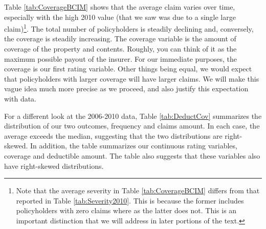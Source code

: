 \documentclass[]{book}
\let\rmarkdownfootnote\footnote%
\def\footnote{\protect\rmarkdownfootnote}
\theoremstyle{definition}
\theoremstyle{definition}
\theoremstyle{definition}
\theoremstyle{remark}
\begin{document}
Table \ref{tab:CoverageBCIM} shows that the average claim varies over
time, especially with the high 2010 value (that we saw was due to a
single large claim)\footnote{Note that the average severity in Table
  \ref{tab:CoverageBCIM} differs from that reported in Table
  \ref{tab:Severity2010}. This is because the former includes
  policyholders with zero claims where as the latter does not. This is
  an important distinction that we will address in later portions of the
  text.}. The total number of policyholders is steadily declining and,
conversely, the coverage is steadily increasing. The coverage variable
is the amount of coverage of the property and contents. Roughly, you can
think of it as the maximum possible payout of the insurer. For our
immediate purposes, the coverage is our first rating variable. Other
things being equal, we would expect that policyholders with larger
coverage will have larger claims. We will make this vague idea much more
precise as we proceed, and also justify this expectation with data.

For a different look at the 2006-2010 data, Table \ref{tab:DeductCov}
summarizes the distribution of our two outcomes, frequency and claims
amount. In each case, the average exceeds the median, suggesting that
the two distributions are right-skewed. In addition, the table
summarizes our continuous rating variables, coverage and deductible
amount. The table also suggests that these variables also have
right-skewed distributions.
\end{document}
